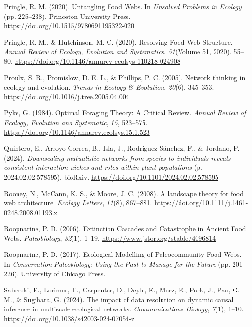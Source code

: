 \documentclass[
]{article}
\newlength{\cslhangindent}
\newenvironment{CSLReferences}[2] %
 {\begin{list}{}{%
  \setlength{\itemindent}{0pt}
  \setlength{\leftmargin}{0pt}
  \setlength{\parsep}{0pt}
  \ifodd #1
   \setlength{\leftmargin}{\cslhangindent}
   \setlength{\itemindent}{-1\cslhangindent}
  \fi
  \setlength{\itemsep}{#2\baselineskip}}}
 {\end{list}}
\begin{document}
\begin{CSLReferences}{1}{0}
Pringle, R. M. (2020). Untangling {Food Webs}. In \emph{Unsolved
{Problems} in {Ecology}} (pp. 225--238). Princeton University Press.
\url{https://doi.org/10.1515/9780691195322-020}

Pringle, R. M., \& Hutchinson, M. C. (2020). Resolving {Food-Web
Structure}. \emph{Annual Review of Ecology, Evolution and Systematics},
\emph{51}(Volume 51, 2020), 55--80.
\url{https://doi.org/10.1146/annurev-ecolsys-110218-024908}

Proulx, S. R., Promislow, D. E. L., \& Phillips, P. C. (2005). Network
thinking in ecology and evolution. \emph{Trends in Ecology \&
Evolution}, \emph{20}(6), 345--353.
\url{https://doi.org/10.1016/j.tree.2005.04.004}

Pyke, G. (1984). Optimal {Foraging Theory}: {A Critical Review}.
\emph{Annual Review of Ecology, Evolution and Systematic}, \emph{15},
523--575. \url{https://doi.org/10.1146/annurev.ecolsys.15.1.523}

Quintero, E., Arroyo-Correa, B., Isla, J., Rodríguez-Sánchez, F., \&
Jordano, P. (2024). \emph{Downscaling mutualistic networks from species
to individuals reveals consistent interaction niches and roles within
plant populations} (p. 2024.02.02.578595). bioRxiv.
\url{https://doi.org/10.1101/2024.02.02.578595}

Rooney, N., McCann, K. S., \& Moore, J. C. (2008). A landscape theory
for food web architecture. \emph{Ecology Letters}, \emph{11}(8),
867--881. \url{https://doi.org/10.1111/j.1461-0248.2008.01193.x}

Roopnarine, P. D. (2006). Extinction {Cascades} and {Catastrophe} in
{Ancient Food Webs}. \emph{Paleobiology}, \emph{32}(1), 1--19.
\url{https://www.jstor.org/stable/4096814}

Roopnarine, P. D. (2017). Ecological {Modelling} of {Paleocommunity Food
Webs}. In \emph{Conservation {Paleobiology}: {Using} the {Past} to
{Manage} for the {Future}} (pp. 201--226). University of Chicago Press.

Saberski, E., Lorimer, T., Carpenter, D., Deyle, E., Merz, E., Park, J.,
Pao, G. M., \& Sugihara, G. (2024). The impact of data resolution on
dynamic causal inference in multiscale ecological networks.
\emph{Communications Biology}, \emph{7}(1), 1--10.
\url{https://doi.org/10.1038/s42003-024-07054-z}


\end{CSLReferences}
\end{document}
